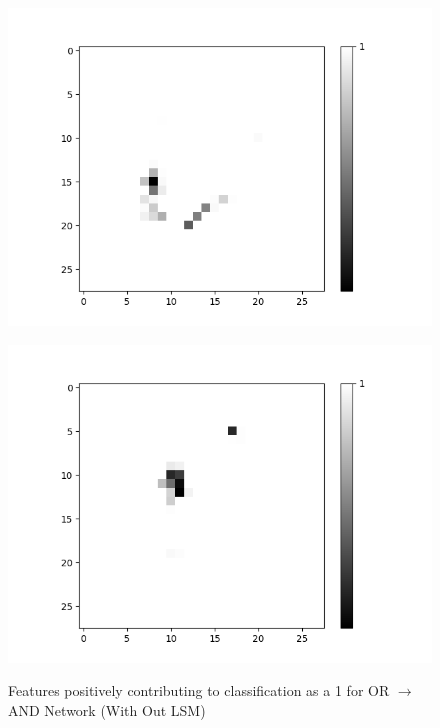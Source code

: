 \begin{minipage}[t]{0.6\textwidth}
\begin{figure}[H]
\begin{minipage}[b]{0.24\textwidth}
			\includegraphics[width=\textwidth]{OR-AND(WO-LSM)(1)/Like/False/Layer0-Neuron-10.png}
			\label{}
		\end{minipage}
		\begin{minipage}[b]{0.24\textwidth}
			\captionsetup{labelformat=empty}
			\includegraphics[width=\textwidth]{OR-AND(WO-LSM)(1)/Like/False/Layer0-Neuron-15.png}
			\label{}
		\end{minipage}
		\caption{Features positively contributing to classification as a 1 for OR $\rightarrow$ AND Network (With Out LSM)}
		\label{fig:or-and-net-without-lsm-pos}
		\hfill
	\end{figure}
\end{minipage}


